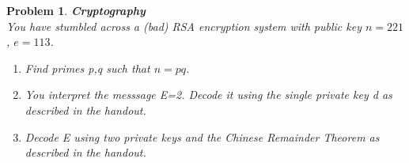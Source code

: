 \documentclass{article}
\newtheorem{problem}{Problem}
\theoremstyle{definition}
\begin{document}
\begin{problem}\textbf{Cryptography}\\
You have stumbled across a (bad) RSA encryption system with public key $n=221$, $e=113$.
\begin{enumerate}[label=\alph*)]
    \item Find primes p,q such that $n=pq$.
    
    \item You interpret the messsage E=2. Decode it using the single private key \textit{d} as described in the handout.
    
    \item Decode E using two private keys and the Chinese Remainder Theorem as described in the handout.
\end{enumerate}
\end{problem}
\end{document}
